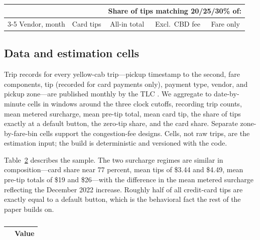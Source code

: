 \begin{table}[!htbp]
  \centering
  \singlespacing
  \caption{}
  \label{tab:vendor}
  \small
  \begin{tabular}{@{}lcccc@{}}
    \toprule
    & & \multicolumn{3}{c}{Share of tips matching 20/25/30\% of:} \\
    \cmidrule(lr){3-5}
    Vendor, month & Card tips & All-in total & Excl.\ CBD fee & Fare only \\
    \midrule
    
    \bottomrule
  \end{tabular}
\end{table}

\subsection{Data and estimation cells}
Trip records for every yellow-cab trip---pickup timestamp to the second,
fare components, tip (recorded for card payments only), payment type,
vendor, and pickup zone---are published monthly by the TLC
\parencite{tlc2026trip}. We aggregate to date-by-minute cells in windows
around the three clock cutoffs, recording trip counts, mean metered
surcharge, mean pre-tip total, mean card tip, the share of tips exactly
at a default button, the zero-tip share, and the card share. Separate
zone-by-fare-bin cells support the congestion-fee designs. Cells, not
raw trips, are the estimation input; the build is deterministic and
versioned with the code.

Table~\ref{tab:descriptive} describes the sample. The two surcharge
regimes are similar in composition---card share near 77 percent, mean
tips of \$3.44 and \$4.49, mean pre-tip totals of \$19 and \$26---with
the difference in the mean metered surcharge reflecting the December
2022 increase. Roughly half of all credit-card tips are exactly equal to
a default button, which is the behavioral fact the rest of the paper
builds on.

\begin{table}[!htbp]
  \centering
  \singlespacing
  \caption{}
  \label{tab:descriptive}
  \small
  \begin{tabular}{@{}p{}r@{}}
    \toprule
    & Value \\
    \midrule
    
    \bottomrule
  \end{tabular}
\end{table}

